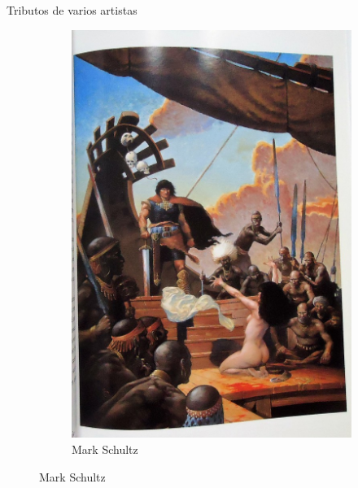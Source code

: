 \begin{frame}{Tributos de varios artistas}
\begin{figure}[htp]
\begin{subfigure}[b]{0.22\textwidth}
			\includegraphics[width=\textwidth]{img/tributos/MarkSchultz2}
			\caption{Mark Schultz}
		\end{subfigure}
	\end{figure}
\end{frame}
\note[itemize]{
	\item
}

